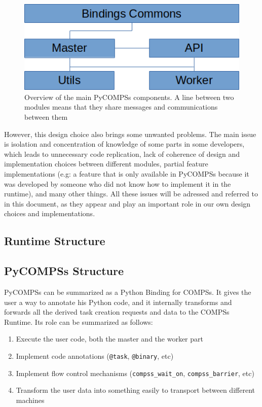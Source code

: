 \begin{figure}
\centering
\includegraphics{figures/pycompss_modules.png}
\caption{Overview of the main PyCOMPSs components. A line between two modules means that they share messages and communications between them}
\label{fig:pycompss_modules}
\end{figure}

However, this design choice also brings some unwanted problems. The main issue is isolation and concentration of knowledge of some parts in some developers, which leads to unnecessary code replication, lack of coherence of design and implementation choices between different modules, partial feature implementations (e.g: a feature that is only available in PyCOMPSs because it was developed by someone who did not know how to implement it in the runtime), and many other things. All these issues will be adressed and referred to in this document, as they appear and play an important role in our own design choices and implementations.

\subsection{Runtime Structure}
\label{subsec:runtime_structure}

\subsection{PyCOMPSs Structure}
\label{subsec:pycompss_structure}
PyCOMPSs can be summarized as a Python Binding for COMPSs. It gives the user a way to annotate his Python code, and it internally transforms and forwards all the derived task creation requests and data to the COMPSs Runtime. Its role can be summarized as follows:
\begin{enumerate}
\item Execute the user code, both the master and the worker part
\item Implement code annotations (\verb|@task|, \verb|@binary|, etc)
\item Implement flow control mechanisms (\verb|compss_wait_on|, \verb|compss_barrier|, etc)
\item Transform the user data into something easily to transport between different machines
\end{enumerate}


